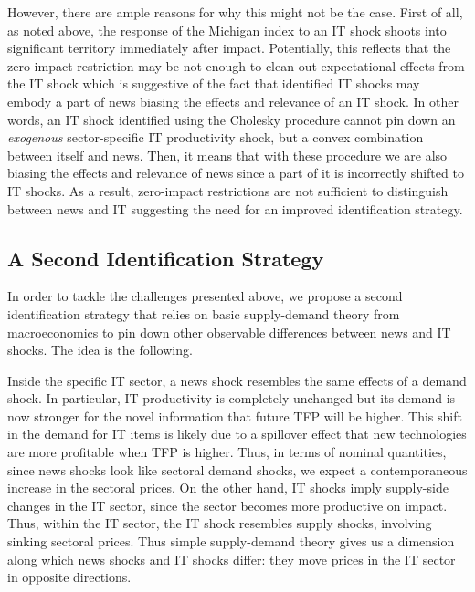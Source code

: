 \documentclass{article}
\begin{document}
However, there are ample reasons for why this might not be the case. First of all, as noted above, the response of the Michigan index to an IT shock shoots into significant territory immediately after impact. Potentially, this reflects that the zero-impact restriction may be not enough to clean out expectational effects from the IT shock which is suggestive of the fact that identified IT shocks may embody a part of news biasing the effects and relevance of an IT shock. In other words, an IT shock identified using the Cholesky procedure cannot pin down an \emph{exogenous} sector-specific IT productivity shock, but a convex combination between itself and news. Then, it means that with these procedure we are also biasing the effects and relevance of news since a part of it is incorrectly shifted to IT shocks. As a result,  zero-impact restrictions are not sufficient to distinguish between news and IT suggesting the need for an improved identification strategy.



\subsection{A Second Identification Strategy}

In order to tackle the challenges presented above, we propose a second identification strategy that relies on basic supply-demand theory from macroeconomics to pin down other observable differences between news and IT shocks. The idea is the following. 

Inside the specific IT sector, a news shock resembles the same effects of a demand shock. In particular, IT productivity is completely unchanged but its demand is now stronger for the novel information that future TFP will be higher. This shift in the demand for IT items is likely due to a spillover effect that new technologies are more profitable when TFP is higher. Thus, in terms of nominal quantities, since news shocks look like sectoral demand shocks, we expect a contemporaneous increase in the sectoral prices. On the other hand, IT shocks imply supply-side changes in the IT sector, since the sector becomes more productive on impact. Thus, within the IT sector, the IT shock resembles supply shocks, involving sinking sectoral prices. Thus simple supply-demand theory gives us a dimension along which news shocks and IT shocks differ: they move prices in the IT sector in opposite directions.
\end{document}
